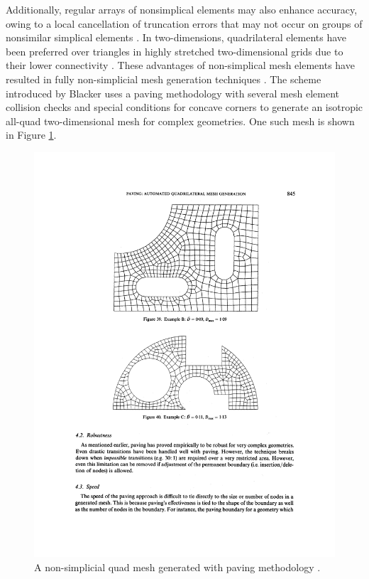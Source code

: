 Additionally, regular arrays of nonsimplical elements may also enhance accuracy, owing to a local cancellation of truncation errors that may not occur on groups of nonsimilar simplical elements \cite{mavriplis1997unstructured}. In two-dimensions, quadrilateral elements have been preferred over triangles in highly stretched two-dimensional grids due to their lower connectivity \cite{aftosmis1994accuracy}. These advantages of non-simplical mesh elements have resulted in fully non-simplicial mesh generation techniques \cite{blacker1991paving, zhu1991new}. The scheme introduced by Blacker \etal \cite{blacker1991paving} uses a paving methodology with several mesh element collision checks and special conditions for concave corners to generate an isotropic all-quad two-dimensional mesh for complex geometries. One such mesh is shown in Figure \ref{fig-quadMesh}.

\begin{figure}
	\centering
	\includegraphics[trim={0 65.5cm 0 14cm },clip,width=\linewidth]{img/intro/lit/quadMesh.png}
	\caption{A non-simplicial quad mesh generated with paving methodology \cite{blacker1991paving}.}
	\label{fig-quadMesh}
\end{figure}

